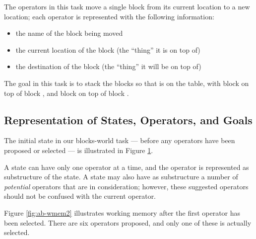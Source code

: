 The operators in this task move a single block from its current location to a
new location; each operator is represented with the following information: 
\vspace{-12pt}
\begin{itemize}
\item the name of the block being moved \vspace{-9pt}
\item the current location of the block (the ``thing'' it is on top of) \vspace{-9pt}
\item the destination of the block (the ``thing'' it will be on top of) 
\vspace{-9pt}
\end{itemize}

The goal in this task is to stack the blocks so that  is on the
table, with block  on top of block , and block  on
top of block .

\subsection{Representation of States, Operators, and Goals}
\label{OVERVIEW-ps-representation}

The initial state in our blocks-world task --- before any operators have been
proposed or selected --- is illustrated in Figure \ref{fig:ab-wmem}.

\begin{figure}
\label{fig:ab-wmem}
\end{figure}

A state can have only one operator at a time, and the operator is represented
as substructure of the state. A state may also have as substructure a number
of \emph{potential} operators that are in consideration; however, these
suggested operators should not be confused with the current operator. 

Figure \ref{fig:ab-wmem2} illustrates working memory after the first operator
has been selected. There are six operators proposed, and only one of
these is actually selected.

